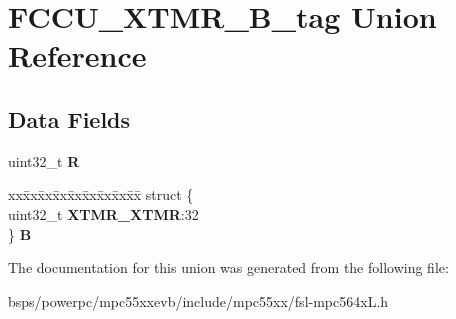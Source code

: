 \hypertarget{unionFCCU__XTMR__32B__tag}{}\section{F\+C\+C\+U\+\_\+\+X\+T\+M\+R\+\_\+B\+\_\+tag Union Reference}
\label{unionFCCU__XTMR__32B__tag}
\subsection*{Data Fields}
\begin{DoxyCompactItemize}
\item 
\mbox{\label{unionFCCU__XTMR__32B__tag_ae4575b8aac13419fc1d480b7c67fffb9}} 
uint32\+\_\+t {\bfseries R}
\item 
\mbox{\label{unionFCCU__XTMR__32B__tag_ae6e4fa1bc4d5df41f5cfd158edb07385}} 
\begin{tabbing}
xx\=xx\=xx\=xx\=xx\=xx\=xx\=xx\=xx\=\kill
struct \{\\
\>uint32\_t {\bfseries XTMR\_XTMR}:32\\
\} {\bfseries B}\\

\end{tabbing}\end{DoxyCompactItemize}


The documentation for this union was generated from the following file\+:\begin{DoxyCompactItemize}
\item 
bsps/powerpc/mpc55xxevb/include/mpc55xx/fsl-\/mpc564x\+L.\+h\end{DoxyCompactItemize}

